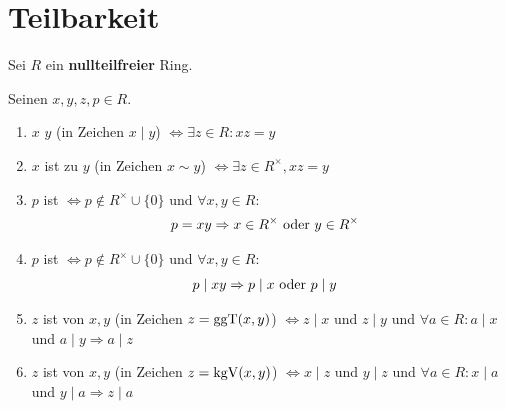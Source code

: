 \section{Teilbarkeit}

Sei $R$ ein \textbf{nullteilfreier} Ring.

\begin{definition}
	Seinen $x,y,z,p \in R$.
	\begin{enumerate}[label=(\alph*)]
		\item $x$  $y$ (in Zeichen $x \mid y$) $\Leftrightarrow \exists z \in R: xz = y$
		\item $x$ ist  zu $y$ (in Zeichen $x \sim y$) $\Leftrightarrow \exists z \in R^{\times}, xz = y$
		\item $p$ ist  $\Leftrightarrow p \not \in R^{\times} \cup \{  0\}$ und $\forall x,y \in R$:
		\begin{align}
			p = xy &\Rightarrow x \in R^{\times} \text{ oder } y \in R^{\times} \notag
		\end{align}
		\item $p$ ist  $\Leftrightarrow  p \not \in R^{\times} \cup \{ 0 \}$ und $\forall x,y \in R$:
		\begin{align}
			p \mid xy &\Rightarrow p \mid x \text{ oder } p \mid y \notag
		\end{align}
		\item $z$ ist  von $x,y$ (in Zeichen $z = \operatorname{ggT}(x,y)$) $\Leftrightarrow  z \mid x$ und $z \mid y$ und $\forall a \in R: a\mid x$ und $a \mid y\Rightarrow a \mid z$
		\item $z$ ist  von $x,y$ (in Zeichen $z = \operatorname{kgV}(x,y)$) $\Leftrightarrow x \mid z$ und $y \mid z$ und $\forall a \in R: x \mid a$ und $y \mid a \Rightarrow z \mid a$
	\end{enumerate}
\end{definition}

